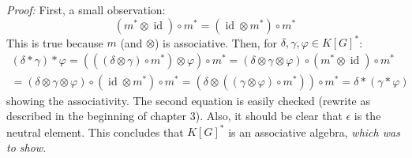 \textit{Proof:} First, a small observation:
\begin{equation}
  \left(m^\ast \otimes \operatorname{id} \right) \circ m^\ast = \left( \operatorname{id} \otimes m^\ast \right) \circ m^\ast
\end{equation}
This is true because $m$ (and $ \otimes $) is associative.
Then, for $\delta, \gamma, \varphi \in K \left\lbrack G \right\rbrack^\ast$:
\begin{equation}
  \begin{aligned}
  \left( \delta \ast \gamma \right) \ast \varphi
  = \left( \left( \left( \delta \otimes \gamma \right) \circ m^\ast \right) \otimes \varphi \right) \circ m^\ast
  = \left( \delta \otimes \gamma \otimes \varphi \right) \circ \left( m^\ast \otimes \operatorname{id} \right) \circ m^\ast \\
  = \left( \delta \otimes \gamma \otimes \varphi \right) \circ \left( \operatorname{id} \otimes m^\ast \right) \circ m^\ast
  = \left( \delta \otimes \left( \left( \gamma \otimes \varphi \right) \circ m^\ast \right) \right) \circ m^\ast
  = \delta \ast \left( \gamma \ast \varphi \right)
  \end{aligned}
\end{equation}
showing the associativity.
The second equation is easily checked (rewrite as described in the beginning of chapter 3).
Also, it should be clear that $\epsilon$ is the neutral element.
This concludes that $K \left\lbrack G \right\rbrack^\ast$ is an associative algebra, \textit{which was to show}.

